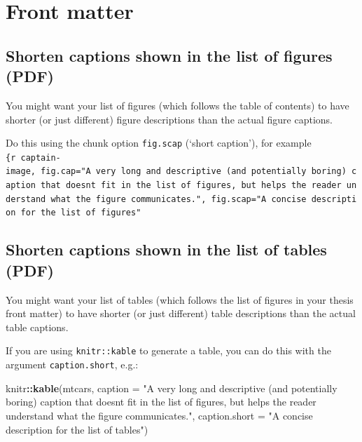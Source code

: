 \documentclass[a4paper, nobind]{templates/ociamthesis}
\newenvironment{Shaded}{\begin{snugshade}}{\end{snugshade}}
\newcommand{\AttributeTok}[1]{\textcolor[rgb]{0.13,0.29,0.53}{#1}}
\newcommand{\FunctionTok}[1]{\textcolor[rgb]{0.13,0.29,0.53}{\textbf{#1}}}
\newcommand{\NormalTok}[1]{#1}
\newcommand{\SpecialCharTok}[1]{\textcolor[rgb]{0.81,0.36,0.00}{\textbf{#1}}}
\newcommand{\StringTok}[1]{\textcolor[rgb]{0.31,0.60,0.02}{#1}}
\renewenvironment{Shaded}
{
  \vspace{10pt}%
  \begin{snugshade}%
}{%
  \end{snugshade}%
  \vspace{8pt}%
}
\begin{document}
\section{Front matter}\label{front-matter}

\subsection{Shorten captions shown in the list of figures (PDF)}\label{shorten-captions-shown-in-the-list-of-figures-pdf}

You might want your list of figures (which follows the table of contents) to have shorter (or just different) figure descriptions than the actual figure captions.

Do this using the chunk option \texttt{fig.scap} (`short caption'), for example \texttt{\{r\ captain-image,\ fig.cap="A\ very\ long\ and\ descriptive\ (and\ potentially\ boring)\ caption\ that\ doesn\textquotesingle{}t\ fit\ in\ the\ list\ of\ figures,\ but\ helps\ the\ reader\ understand\ what\ the\ figure\ communicates.",\ fig.scap="A\ concise\ description\ for\ the\ list\ of\ figures"}

\subsection{Shorten captions shown in the list of tables (PDF)}\label{shorten-captions-shown-in-the-list-of-tables-pdf}

You might want your list of tables (which follows the list of figures in your thesis front matter) to have shorter (or just different) table descriptions than the actual table captions.

If you are using \texttt{knitr::kable} to generate a table, you can do this with the argument \texttt{caption.short}, e.g.:

\begin{Shaded}
\begin{Highlighting}[]
\NormalTok{knitr}\SpecialCharTok{::}\FunctionTok{kable}\NormalTok{(mtcars,}
              \AttributeTok{caption =} \StringTok{"A very long and descriptive (and potentially}
\StringTok{              boring) caption that doesn\textquotesingle{}t fit in the list of figures,}
\StringTok{              but helps the reader understand what the figure }
\StringTok{              communicates."}\NormalTok{,}
              \AttributeTok{caption.short =} \StringTok{"A concise description for the list of tables"}\NormalTok{)}
\end{Highlighting}
\end{Shaded}
\end{document}
